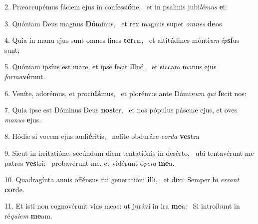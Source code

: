 2. Præoccupémus fáciem ejus in confessi\textbf{ó}ne, \ast\  et in psalmis jubi\textit{lé}\textit{mus} \textbf{e}i:\

3. Quóniam Deus magnus \textbf{Dó}minus, \ast\  et rex magnus super \textit{om}\textit{nes} \textbf{de}os.\

4. Quia in manu ejus sunt omnes fines \textbf{ter}ræ, \ast\  et altitúdines mónti\textit{um} \textit{ip}\textbf{sí}us sunt;\

5. Quóniam ipsíus est mare, et ipse fecit \textbf{il}lud, \ast\  et siccam manus ejus \textit{for}\textit{ma}\textbf{vé}runt.\

6. Veníte, adorémus, et proci\textbf{dá}mus, \ast\  et plorémus ante Dómi\textit{num} \textit{qui} \textbf{fe}cit nos:\

7. Quia ipse est Dóminus Deus \textbf{nos}ter, \ast\  et nos pópulus páscuæ ejus, et oves \textit{ma}\textit{nus} \textbf{e}jus.\

8. Hódie si vocem ejus audi\textbf{é}ritis, \ast\  nolíte obduráre \textit{cor}\textit{da} \textbf{ves}tra\

9. Sicut in irritatióne, secúndum diem tentatiónis in desérto, \dag\  ubi tentavérunt me patres \textbf{ves}tri: \ast\  probavérunt me, et vidérunt ó\textit{pe}\textit{ra} \textbf{me}a.\

10. Quadragínta annis offénsus fui generatióni \textbf{il}li, \ast\  et dixi: Semper hi \textit{er}\textit{rant} \textbf{cor}de.\

11. Et isti non cognovérunt vias meas: ut jurávi in ira \textbf{me}a: \ast\  Si introíbunt in ré\textit{qui}\textit{em} \textbf{me}am.\

